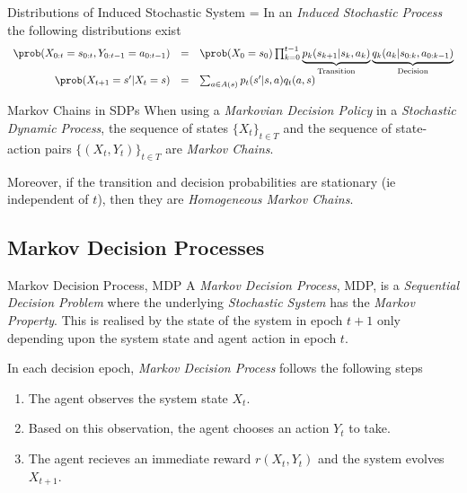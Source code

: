 \documentclass[11pt,a4paper]{article}
\begin{document}
  \begin{proposition}{Distributions of Induced Stochastic System}
    \everymath={\displaystyle}
    In an \textit{Induced Stochastic Process} the following distributions exist
    \[\begin{array}{rcl}
      \prob(X_{0:t}=s_{0:t},Y_{0:t-1}=a_{0:t-1})&=&\prob(X_0=s_0)\prod_{k=0}^{t-1}\underbrace{p_k(s_{k+1}|s_k,a_k)}_\text{Transition}\underbrace{q_k(a_k|s_{0:k},a_{0:k-1})}_\text{Decision}\\
      \prob(X_{t+1}=s'|X_t=s)&=&\sum_{a\in A(s)}p_t(s'|s,a)q_t(a,s)
    \end{array}\]
  \end{proposition}

  \begin{theorem}{Markov Chains in SDPs}
    When using a \textit{Markovian Decision Policy} in a \textit{Stochastic Dynamic Process}, the sequence of states $\{X_t\}_{t\in T}$ and the sequence of state-action pairs $\{(X_t,Y_t)\}_{t\in T}$ are \textit{Markov Chains}.
    \par Moreover, if the transition and decision probabilities are stationary (ie independent of $t$), then they are \textit{Homogeneous Markov Chains}.
  \end{theorem}

\subsection{Markov Decision Processes}

  \begin{definition}{Markov Decision Process, MDP}
    A \textit{Markov Decision Process}, MDP, is a \textit{Sequential Decision Problem} where the underlying \textit{Stochastic System} has the \textit{Markov Property}. This is realised by the state of the system in epoch $t+1$ only depending upon the system state and agent action in epoch $t$.
    \par In each decision epoch, \textit{Markov Decision Process} follows the following steps
    \begin{enumerate}
      \item The agent observes the system state $X_t$.
      \item Based on this observation, the agent chooses an action $Y_t$ to take.
      \item The agent recieves an immediate reward $r(X_t,Y_t)$ and the system evolves $X_{t+1}$.
    \end{enumerate}
  \end{definition}
\end{document}
